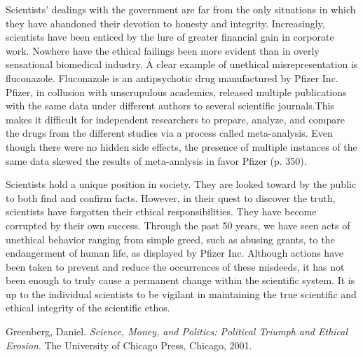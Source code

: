 \documentclass{article}[12pt]
\begin{document}
Scientists' dealings with the government are far from the only situations in
which they have abandoned their devotion to honesty and integrity.
Increasingly, scientists have been enticed by the lure of greater financial
gain in corporate work. Nowhere have the ethical failings been more evident
than in overly sensational biomedical industry. A clear example of unethical
misrepresentation is fluconazole.  Fluconazole is an antipsychotic drug
manufactured by Pfizer Inc.  Pfizer, in collusion with unscrupulous academics,
released multiple publications with the same data under different authors to
several scientific journals.This makes it difficult for independent researchers
to prepare, analyze, and compare the drugs from  the different studies via a
process called meta-analysis. Even though there were no hidden side effects, 
the presence of multiple instances of the same
data skewed the results of meta-analysis in favor Pfizer (p. 350).

Scientists hold a unique position in society. They are looked toward by the
public to both find and confirm facts. However, in their quest to discover the
truth, scientists have forgotten their ethical responsibilities.  They have
become corrupted by their own success.  Through the past 50 years, we have seen
acts of unethical behavior ranging from simple greed, such as abusing grants,
to the endangerment of human life, as displayed by Pfizer Inc.  Although
actions have been taken to prevent and reduce the occurrences of these
misdeeds, it has not been enough to truly cause a permanent change within the
scientific system. It is up to the individual scientists to be vigilant in
maintaining the true scientific and ethical integrity of the scientific ethos.

\newpage
\begin{thebibliography}{9}

  Greenberg, Daniel.
  \emph{Science, Money, and Politics: Political Triumph and Ethical Erosion}.
  The University of Chicago Press, Chicago,
  2001.

\end{thebibliography}
\end{document}
